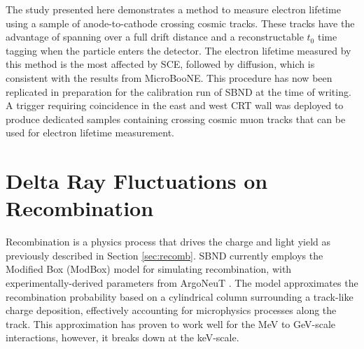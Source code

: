 The study presented here demonstrates a method to measure electron lifetime using a sample of anode-to-cathode crossing cosmic tracks.
These tracks have the advantage of spanning over a full drift distance and a reconstructable $t_{0}$ time tagging when the particle enters the detector.
The electron lifetime measured by this method is the most affected by SCE, followed by diffusion, which is consistent with the results from MicroBooNE.
This procedure has now been replicated in preparation for the calibration run of SBND at the time of writing.
A trigger requiring coincidence in the east and west CRT wall was deployed to produce dedicated samples containing crossing cosmic muon tracks that can be used for electron lifetime measurement.


\section{Delta Ray Fluctuations on Recombination}
\label{sec7:delta}


Recombination is a physics process that drives the charge and light yield as previously described in Section \ref{sec:recomb}.
SBND currently employs the Modified Box (ModBox) model for simulating recombination, with experimentally-derived parameters from ArgoNeuT \cite{argoneut_recomb}.
The model approximates the recombination probability based on a cylindrical column surrounding a track-like charge deposition, effectively accounting for microphysics processes along the track.
This approximation has proven to work well for the MeV to GeV-scale interactions, however, it breaks down at the keV-scale.


